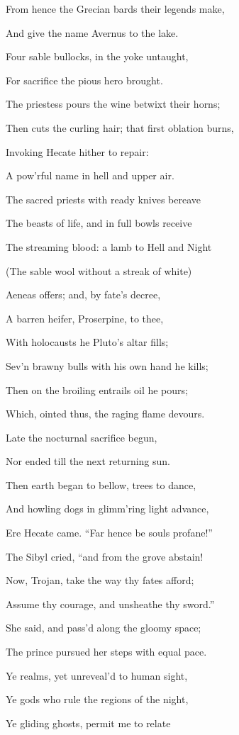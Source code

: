 From hence the Grecian bards their legends make,

And give the name Avernus to the lake.

Four sable bullocks, in the yoke untaught,

For sacrifice the pious hero brought.

The priestess pours the wine betwixt their horns;

Then cuts the curling hair; that first oblation burns,

Invoking Hecate hither to repair:

A pow’rful name in hell and upper air.

The sacred priests with ready knives bereave

The beasts of life, and in full bowls receive

The streaming blood: a lamb to Hell and Night

(The sable wool without a streak of white)

Aeneas offers; and, by fate’s decree,

A barren heifer, Proserpine, to thee,

With holocausts he Pluto’s altar fills;

Sev’n brawny bulls with his own hand he kills;

Then on the broiling entrails oil he pours;

Which, ointed thus, the raging flame devours.

Late the nocturnal sacrifice begun,

Nor ended till the next returning sun.

Then earth began to bellow, trees to dance,

And howling dogs in glimm’ring light advance,

Ere Hecate came. “Far hence be souls profane!”

The Sibyl cried, “and from the grove abstain!

Now, Trojan, take the way thy fates afford;

Assume thy courage, and unsheathe thy sword.”

She said, and pass’d along the gloomy space;

The prince pursued her steps with equal pace.

Ye realms, yet unreveal’d to human sight,

Ye gods who rule the regions of the night,

Ye gliding ghosts, permit me to relate

